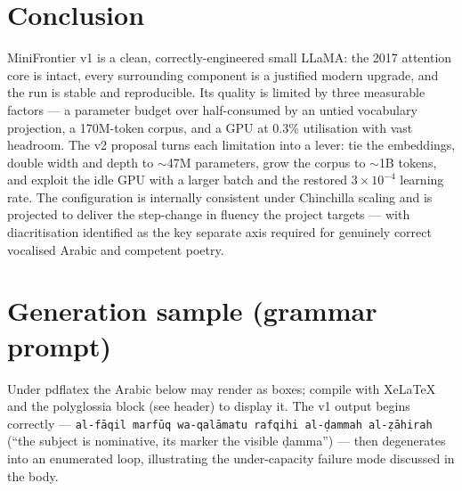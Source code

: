 \documentclass[10pt,twocolumn]{article}
\begin{document}
\section{Conclusion}
MiniFrontier v1 is a clean, correctly-engineered small LLaMA: the 2017 attention
core is intact, every surrounding component is a justified modern upgrade, and
the run is stable and reproducible. Its quality is limited by three measurable
factors --- a parameter budget over half-consumed by an untied vocabulary
projection, a 170M-token corpus, and a GPU at 0.3\% utilisation with vast
headroom. The v2 proposal turns each limitation into a lever: tie the embeddings,
double width and depth to $\sim$47M parameters, grow the corpus to $\sim$1B
tokens, and exploit the idle GPU with a larger batch and the restored
$3\!\times\!10^{-4}$ learning rate. The configuration is internally consistent
under Chinchilla scaling and is projected to deliver the step-change in fluency
the project targets --- with diacritisation identified as the key separate axis
required for genuinely correct vocalised Arabic and competent poetry.

\appendix
\section{Generation sample (grammar prompt)}
Under pdflatex the Arabic below may render as boxes; compile with XeLaTeX and the
polyglossia block (see header) to display it. The v1 output begins correctly ---
\texttt{al-f\=aqil marf\=uq wa-qal\=amatu rafqihi al-\d{d}ammah al-\d{z}\=ahirah}
(``the subject is nominative, its marker the visible \d{d}amma'') --- then
degenerates into an enumerated loop, illustrating the under-capacity failure mode
discussed in the body.
\end{document}
